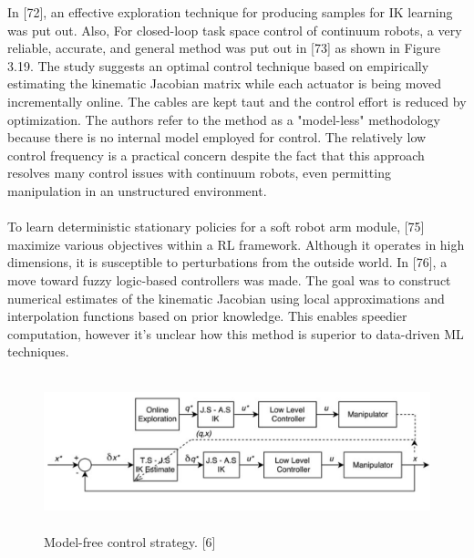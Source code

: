 \documentclass[12pt,twoside,a4]{mwbk}
\begin{document}
\noindent In [72], an effective exploration technique for producing samples for IK learning was put out. Also, For closed-loop task space control of continuum robots, a very reliable, accurate, and general method was put out in [73] as shown in Figure 3.19. The study suggests an optimal control technique based on empirically estimating the kinematic Jacobian matrix while each actuator is being moved incrementally online. The cables are kept taut and the control effort is reduced by optimization. The authors refer to the method as a "model-less" methodology because there is no internal model employed for control. The relatively low control frequency is a practical concern despite the fact that this approach resolves many control issues with continuum robots, even permitting manipulation in an unstructured environment.
\\ \\
To learn deterministic stationary policies for a soft robot arm module,  [75] maximize various objectives within a RL framework. Although it operates in high dimensions, it is susceptible to perturbations from the outside world. In [76], a move toward fuzzy logic-based controllers was made. The goal was to construct numerical estimates of the kinematic Jacobian using local approximations and interpolation functions based on prior knowledge. This enables speedier computation, however it's unclear how this method is superior to data-driven ML techniques.
\newpage
\begin{figure}[h]
    \centering
    \includegraphics[width=15.0cm, height=4.5cm]{cont6.png}
    \caption{Model-free control strategy. [6]}
\end{figure}
\end{document}
